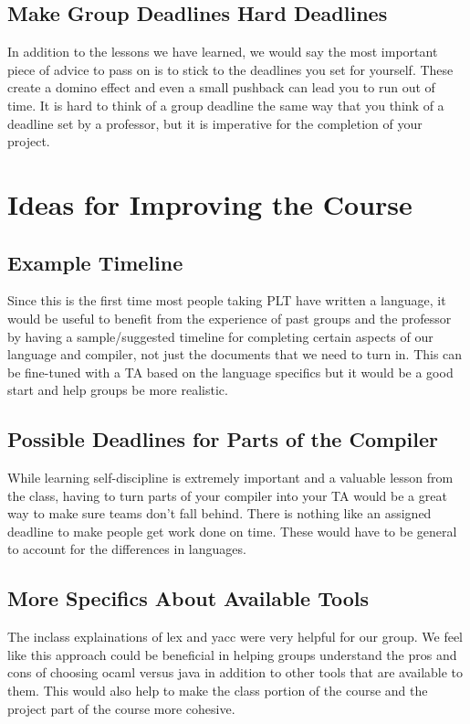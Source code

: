 \subsection{Make Group Deadlines Hard Deadlines}
In addition to the lessons we have learned, we would say the most important piece of advice to pass on is to stick to the deadlines you set for yourself. These create a domino effect and even a small pushback can lead you to run out of time. It is hard to think of a group deadline the same way that you think of a deadline set by a professor, but it is imperative for the completion of your project.

\section{Ideas for Improving the Course}
\subsection{Example Timeline}
Since this is the first time most people taking PLT have written a language, it would be useful to benefit from the experience of past groups and the professor by having a sample/suggested timeline for completing certain aspects of our language and compiler, not just the documents that we need to turn in. This can be fine-tuned with a TA based on the language specifics but it would be a good start and help groups be more realistic.

\subsection{Possible Deadlines for Parts of the Compiler}
While learning self-discipline is extremely important and a valuable lesson from the class, having to turn parts of your compiler into your TA would be a great way to make sure teams don't fall behind. There is nothing like an assigned deadline to make people get work done on time. These would have to be general to account for the differences in languages.

\subsection{More Specifics About Available Tools}
The inclass explainations of lex and yacc were very helpful for our group. We feel like this approach could be beneficial in helping groups understand the pros and cons of choosing ocaml versus java in addition to other tools that are available to them. This would also help to make the class portion of the course and the project part of the course more cohesive.
